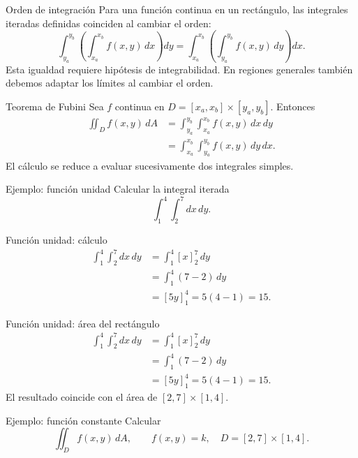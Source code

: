 \documentclass[main.tex]{subfiles}
\begin{document}
\begin{frame}{Orden de integración}
Para una función continua en un rectángulo, las integrales iteradas definidas coinciden al cambiar el orden:\[\int_{y_a}^{y_b}\!\left(\int_{x_a}^{x_b}f(x,y)\,dx\right)dy=\int_{x_a}^{x_b}\!\left(\int_{y_a}^{y_b}f(x,y)\,dy\right)dx.\]Esta igualdad requiere hipótesis de integrabilidad. En regiones generales también debemos adaptar los límites al cambiar el orden.
\end{frame}

\begin{frame}{Teorema de Fubini}
\small Sea $f$ continua en $D=[x_a,x_b]\times[y_a,y_b]$. Entonces\begin{align*}\iint_D f(x,y)\,dA&=\int_{y_a}^{y_b}\int_{x_a}^{x_b}f(x,y)\,dx\,dy\\&=\int_{x_a}^{x_b}\int_{y_a}^{y_b}f(x,y)\,dy\,dx.\end{align*}El cálculo se reduce a evaluar sucesivamente dos integrales simples.
\end{frame}

\begin{frame}{Ejemplo: función unidad}
Calcular la integral iterada\[\int_1^4\int_2^7dx\,dy.\]
\end{frame}

\begin{frame}{Función unidad: cálculo}
\begin{align*}\int_1^4\int_2^7dx\,dy&=\int_1^4[x]_2^7\,dy\\&=\int_1^4(7-2)\,dy\\&=[5y]_1^4=5(4-1)=15.\end{align*}
\end{frame}

\begin{frame}{Función unidad: área del rectángulo}
\small \begin{align*}\int_1^4\int_2^7dx\,dy&=\int_1^4[x]_2^7\,dy\\&=\int_1^4(7-2)\,dy\\&=[5y]_1^4=5(4-1)=15.\end{align*}El resultado coincide con el área de $[2,7]\times[1,4]$.
\end{frame}

\begin{frame}{Ejemplo: función constante}
Calcular\[\iint_D f(x,y)\,dA,\qquad f(x,y)=k,\quad D=[2,7]\times[1,4].\]
\end{frame}
\end{document}
